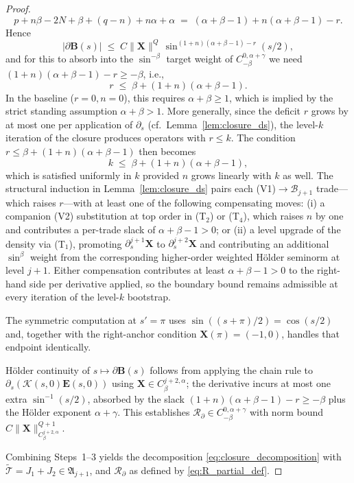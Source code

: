 \documentclass{amsart}
\begin{document}
\begin{proof}
\[
p + n\beta - 2N + \beta + (q - n) + n\alpha + \alpha
\;=\; (\alpha + \beta - 1) + n(\alpha + \beta - 1) - r.
\]
Hence
\[
|\partial\mathbf{B}(s)| \;\le\; C\|\mathbf{X}\|^{Q}\,
\sin^{(1+n)(\alpha+\beta-1) - r}(s/2),
\]
and for this to absorb into the $\sin^{-\beta}$ target weight of $C^{0,\alpha+\gamma}_{-\beta}$ we need $(1 + n)(\alpha+\beta-1) - r \ge -\beta$, i.e.,
\[
r \;\le\; \beta + (1 + n)(\alpha + \beta - 1).
\]
In the baseline ($r = 0, n = 0$), this requires $\alpha + \beta \ge 1$, which is implied by the strict standing assumption $\alpha+\beta>1$.  More generally, since the deficit $r$ grows by at most one per application of $\partial_s$ (cf.\ Lemma~\ref{lem:closure_ds}), the level-$k$ iteration of the closure produces operators with $r \le k$. The condition $r \le \beta + (1+n)(\alpha+\beta-1)$ then becomes
\[
k \;\le\; \beta + (1+n)(\alpha+\beta-1),
\]
which is satisfied uniformly in $k$ provided $n$ grows linearly with $k$ as well. The structural induction in Lemma~\ref{lem:closure_ds} pairs each (V1)$\to \mathcal B_{j+1}$ trade---which raises $r$---with at least one of the following compensating moves: (i) a companion (V2) substitution at top order in (T$_2$) or (T$_4$), which raises $n$ by one and contributes a per-trade slack of $\alpha+\beta-1>0$; or (ii) a level upgrade of the density via (T$_1$), promoting $\partial_s^{j+1}\mathbf{X}$ to $\partial_s^{j+2}\mathbf{X}$ and contributing an additional $\sin^\beta$ weight from the corresponding higher-order weighted Hölder seminorm at level $j+1$. Either compensation contributes at least $\alpha+\beta-1>0$ to the right-hand side per derivative applied, so the boundary bound remains admissible at every iteration of the level-$k$ bootstrap.

The symmetric computation at $s' = \pi$ uses $\sin((s+\pi)/2) = \cos(s/2)$ and, together with the right-anchor condition $\mathbf{X}(\pi) = (-1, 0)$, handles that endpoint identically.

Hölder continuity of $s \mapsto \partial\mathbf{B}(s)$ follows from applying the chain rule to $\partial_s(\mathcal{K}(s,0)\mathbf{E}(s,0))$ using $\mathbf{X} \in C^{j+2,\alpha}_\beta$; the derivative incurs at most one extra $\sin^{-1}(s/2)$, absorbed by the slack $(1 + n)(\alpha + \beta - 1) - r \ge -\beta$ plus the Hölder exponent $\alpha + \gamma$.  This establishes $\mathcal{R}_\partial \in C^{0,\alpha+\gamma}_{-\beta}$ with norm bound $C\|\mathbf{X}\|_{C^{j+2,\alpha}_\beta}^{Q+1}$.

Combining Steps~1--3 yields the decomposition \eqref{eq:closure_decomposition} with $\widetilde{\mathcal{T}} = J_1 + J_2 \in \mathfrak{A}_{j+1}$, and $\mathcal{R}_\partial$ as defined by \eqref{eq:R_partial_def}.
\end{proof}
\end{document}
